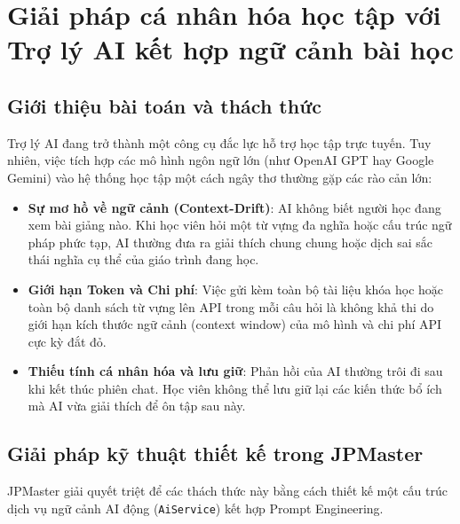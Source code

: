\documentclass[../DoAn.tex]{subfiles}
\begin{document}
\section{Giải pháp cá nhân hóa học tập với Trợ lý AI kết hợp ngữ cảnh bài học}

\subsection{Giới thiệu bài toán và thách thức}
Trợ lý AI đang trở thành một công cụ đắc lực hỗ trợ học tập trực tuyến. Tuy nhiên, việc tích hợp các mô hình ngôn ngữ lớn (như OpenAI GPT hay Google Gemini) vào hệ thống học tập một cách ngây thơ thường gặp các rào cản lớn:
\begin{itemize}
    \item \textbf{Sự mơ hồ về ngữ cảnh (Context-Drift)}: AI không biết người học đang xem bài giảng nào. Khi học viên hỏi một từ vựng đa nghĩa hoặc cấu trúc ngữ pháp phức tạp, AI thường đưa ra giải thích chung chung hoặc dịch sai sắc thái nghĩa cụ thể của giáo trình đang học.
    \item \textbf{Giới hạn Token và Chi phí}: Việc gửi kèm toàn bộ tài liệu khóa học hoặc toàn bộ danh sách từ vựng lên API trong mỗi câu hỏi là không khả thi do giới hạn kích thước ngữ cảnh (context window) của mô hình và chi phí API cực kỳ đắt đỏ.
    \item \textbf{Thiếu tính cá nhân hóa và lưu giữ}: Phản hồi của AI thường trôi đi sau khi kết thúc phiên chat. Học viên không thể lưu giữ lại các kiến thức bổ ích mà AI vừa giải thích để ôn tập sau này.
\end{itemize}

\subsection{Giải pháp kỹ thuật thiết kế trong JPMaster}
JPMaster giải quyết triệt để các thách thức này bằng cách thiết kế một cấu trúc dịch vụ ngữ cảnh AI động (\texttt{AiService}) kết hợp Prompt Engineering.
\end{document}
